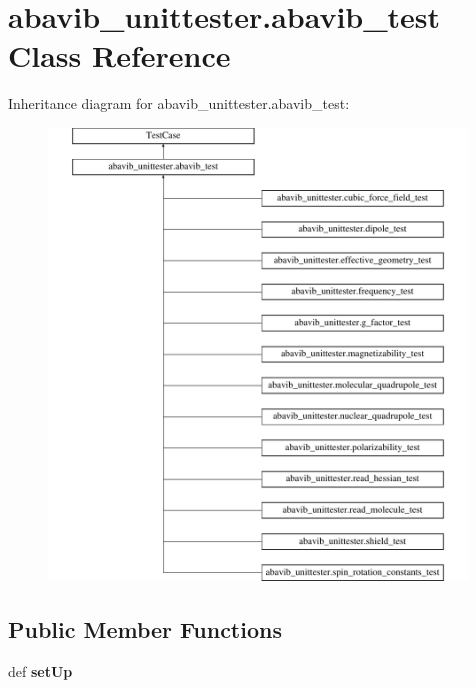 \hypertarget{classabavib__unittester_1_1abavib__test}{\section{abavib\+\_\+unittester.\+abavib\+\_\+test Class Reference}
\label{classabavib__unittester_1_1abavib__test}
}
Inheritance diagram for abavib\+\_\+unittester.\+abavib\+\_\+test\+:\begin{figure}[H]
\begin{center}
\leavevmode
\includegraphics[height=12.000000cm]{classabavib__unittester_1_1abavib__test}
\end{center}
\end{figure}
\subsection*{Public Member Functions}
\begin{DoxyCompactItemize}
\item 
\hypertarget{classabavib__unittester_1_1abavib__test_a8aac0697aaa3a5cdf38ae39c9e4362c5}{def {\bfseries set\+Up}}\label{classabavib__unittester_1_1abavib__test_a8aac0697aaa3a5cdf38ae39c9e4362c5}

\end{DoxyCompactItemize}
